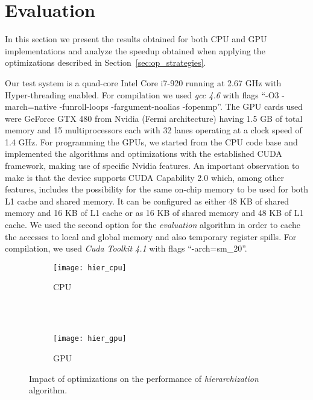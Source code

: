 \section{Evaluation}
\label{sec:evaluation}

In this section we present the results obtained for both CPU and GPU
implementations and analyze the speedup obtained when applying the
optimizations described in Section~\ref{sec:op_strategies}.

Our test system is a quad-core Intel Core i7-920 running at 2.67 GHz with
Hyper-threading enabled. For compilation we used \textit{gcc 4.6} with flags
``-O3 -march=native -funroll-loops -fargument-noalias -fopenmp''. The GPU cards
used were GeForce GTX 480 from Nvidia (Fermi architecture) having 1.5 GB of
total memory and 15 multiprocessors each with 32 lanes operating at a clock
speed of 1.4 GHz. For programming the GPUs, we started from the CPU code base
and implemented the algorithms and optimizations with the established CUDA
framework, making use of specific Nvidia features. An important observation to
make is that the device supports CUDA Capability 2.0 which, among other
features, includes the possibility for the same on-chip memory to be used for
both L1 cache and shared memory. It can be configured as either 48 KB of shared
memory and 16 KB of L1 cache or as 16 KB of shared memory and 48 KB of L1 cache.
We used the second option for the \textit{evaluation} algorithm in order to
cache the accesses to local and global memory and also temporary register
spills. For compilation, we used \textit{Cuda Toolkit 4.1} with flags
``-arch=sm\_20''.

\begin{figure}[t]
  \begin{subfigure}[b]{1\linewidth}
    \centering
    \texttt{[image: hier\_cpu]} \\
    \caption{CPU}
  \end{subfigure}
  \\ \\
  \begin{subfigure}[b]{1\linewidth}
    \centering
    \texttt{[image: hier\_gpu]}
    \caption{GPU}
  \end{subfigure}
  \caption{Impact of optimizations on the performance of \textit{hierarchization} algorithm.}
  \label{fig:hier_results}
\end{figure}

